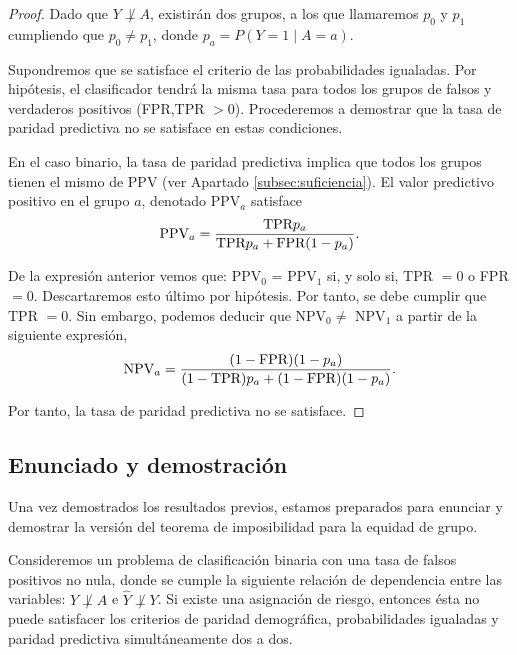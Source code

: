 \documentclass[oneside,openright,titlepage,numbers=noenddot,openany,headinclude,footinclude=true,
cleardoublepage=empty,abstractoff,BCOR=5mm,paper=a4,fontsize=12pt,main=spanish]{scrreprt}
\begin{document}
\begin{proof}
Dado que $Y \not \perp A$, existirán dos grupos, a los que llamaremos $p_0$ y $p_1$ cumpliendo que $p_0\neq p_1$, donde $p_a=P(Y=1 \mid A=a)$.

Supondremos que se satisface el criterio de las probabilidades igualadas. Por hipótesis, el clasificador tendrá la misma tasa para todos los grupos de falsos y verdaderos positivos (FPR,TPR $> 0$). Procederemos a demostrar que la tasa de paridad predictiva no se satisface en estas condiciones.

En el caso binario, la tasa de paridad predictiva implica que todos los grupos tienen el mismo de PPV (ver Apartado \ref{subsec:suficiencia}). El valor predictivo positivo en el grupo $a$, denotado PPV$_a$ satisface
\begin{equation*}
    \text{PPV}_a = \frac{\displaystyle \text{TPR}p_a}{\displaystyle \text{TPR}p_a+\text{FPR}(1-p_a)}.
\end{equation*}

De la expresión anterior vemos que: PPV$_0$ = PPV$_1$ si, y solo si, TPR $= 0$ o FPR $= 0$. Descartaremos esto último por hipótesis. Por tanto, se debe cumplir que TPR $= 0$.  Sin embargo, podemos deducir que NPV$_0 \neq$ NPV$_1$ a partir de la siguiente expresión,
\begin{equation*}
    \text{NPV}_a = \frac{\displaystyle (1-\text{FPR})(1-p_a)}{\displaystyle (1-\text{TPR})p_a+(1-\text{FPR})(1-p_a)}.
\end{equation*}

Por tanto, la tasa de paridad predictiva no se satisface.
\end{proof}

\subsection{Enunciado y demostración}

Una vez demostrados los resultados previos, estamos preparados para enunciar y demostrar la versión del teorema de imposibilidad para la equidad de grupo.\\

\begin{theorem} \label{th:teoimpos}
Consideremos un problema de clasificación binaria con una tasa de falsos positivos no nula, donde se cumple la siguiente relación de dependencia entre las variables: $Y \not \perp A$ e $\hat{Y} \not \perp Y$. Si existe una asignación de riesgo, entonces ésta no puede satisfacer los criterios de paridad demográfica, probabilidades igualadas y paridad predictiva simultáneamente dos a dos.
\end{theorem}
\end{document}
